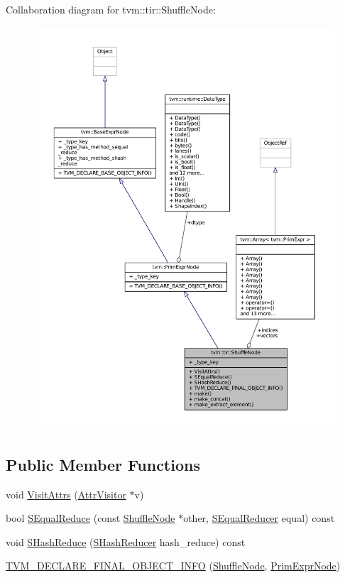 Collaboration diagram for tvm\+:\+:tir\+:\+:Shuffle\+Node\+:
\nopagebreak
\begin{figure}[H]
\begin{center}
\leavevmode
\includegraphics[width=350pt]{classtvm_1_1tir_1_1ShuffleNode__coll__graph}
\end{center}
\end{figure}
\subsection*{Public Member Functions}
\begin{DoxyCompactItemize}
\item 
void \hyperlink{classtvm_1_1tir_1_1ShuffleNode_af764cbab54a79f4f7f3d5e1ddd9e1e5f}{Visit\+Attrs} (\hyperlink{classtvm_1_1AttrVisitor}{Attr\+Visitor} $\ast$v)
\item 
bool \hyperlink{classtvm_1_1tir_1_1ShuffleNode_a2e6ed6e12430264b802e5a86d7833080}{S\+Equal\+Reduce} (const \hyperlink{classtvm_1_1tir_1_1ShuffleNode}{Shuffle\+Node} $\ast$other, \hyperlink{classtvm_1_1SEqualReducer}{S\+Equal\+Reducer} equal) const 
\item 
void \hyperlink{classtvm_1_1tir_1_1ShuffleNode_ad9b879bb15015dccc8fc93918ba41e29}{S\+Hash\+Reduce} (\hyperlink{classtvm_1_1SHashReducer}{S\+Hash\+Reducer} hash\+\_\+reduce) const 
\item 
\hyperlink{classtvm_1_1tir_1_1ShuffleNode_a980a4e844989e3325200c7d0a5303f9d}{T\+V\+M\+\_\+\+D\+E\+C\+L\+A\+R\+E\+\_\+\+F\+I\+N\+A\+L\+\_\+\+O\+B\+J\+E\+C\+T\+\_\+\+I\+N\+FO} (\hyperlink{classtvm_1_1tir_1_1ShuffleNode}{Shuffle\+Node}, \hyperlink{classtvm_1_1PrimExprNode}{Prim\+Expr\+Node})
\end{DoxyCompactItemize}

